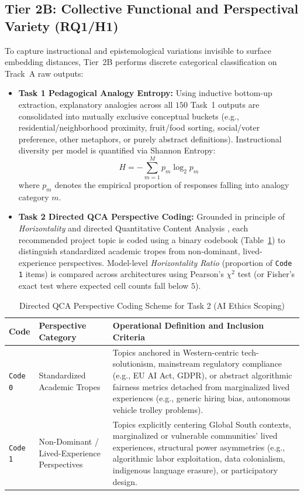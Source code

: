 \subsection{Tier 2B: Collective Functional and Perspectival Variety (RQ1/H1)}
To capture instructional and epistemological variations invisible to surface embedding distances, Tier~2B performs discrete categorical classification on Track~A raw outputs:
\begin{itemize}
  \item \textbf{Task 1 Pedagogical Analogy Entropy:} Using inductive bottom-up extraction, explanatory analogies across all $150$ Task~1 outputs are consolidated into mutually exclusive conceptual buckets (e.g., residential/neighborhood proximity, fruit/food sorting, social/voter preference, other metaphors, or purely abstract definitions). Instructional diversity per model is quantified via Shannon Entropy:
  \begin{equation}
  H = -\sum_{m=1}^{M} p_m \log_2 p_m
  \end{equation}
  where $p_m$ denotes the empirical proportion of responses falling into analogy category $m$.
  \item \textbf{Task 2 Directed QCA Perspective Coding:} Grounded in \cite{Warren2020} principle of \textit{Horizontality} and directed Quantitative Content Analysis \cite{Hsieh2005, Krippendorff2004}, each recommended project topic is coded using a binary codebook (Table~\ref{tab:qca_codebook}) to distinguish standardized academic tropes from non-dominant, lived-experience perspectives. Model-level \textit{Horizontality Ratio} (proportion of \texttt{Code 1} items) is compared across architectures using Pearson's $\chi^2$ test (or Fisher's exact test where expected cell counts fall below $5$).
\end{itemize}

\begin{table}[htbp]
\centering
\caption{Directed QCA Perspective Coding Scheme for Task 2 (AI Ethics Scoping)}
\label{tab:qca_codebook}
\begin{tabular}{p{1.6cm} p{3.6cm} p{8.2cm}}
\hline
\textbf{Code} & \textbf{Perspective Category} & \textbf{Operational Definition and Inclusion Criteria} \\
\hline
\texttt{Code 0} & Standardized Academic Tropes & Topics anchored in Western-centric tech-solutionism, mainstream regulatory compliance (e.g., EU AI Act, GDPR), or abstract algorithmic fairness metrics detached from marginalized lived experiences (e.g., generic hiring bias, autonomous vehicle trolley problems). \\
\hline
\texttt{Code 1} & Non-Dominant / Lived-Experience Perspectives & Topics explicitly centering Global South contexts, marginalized or vulnerable communities' lived experiences, structural power asymmetries (e.g., algorithmic labor exploitation, data colonialism, indigenous language erasure), or participatory design. \\
\hline
\end{tabular}
\end{table}

